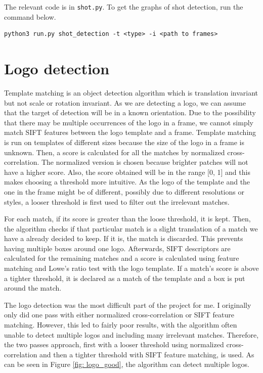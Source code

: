 \documentclass{article}
\begin{document}
The relevant code is in \texttt{shot.py}. To get the graphs of shot detection, run the command below. 
\begin{verbatim}
python3 run.py shot_detection -t <type> -i <path to frames>
\end{verbatim}

\section{Logo detection}
Template matching is an object detection algorithm which is translation invariant but not scale or rotation invariant. As we are detecting a logo, we can assume that the target of detection will be in a known orientation. Due to the possibility that there may be multiple occurrences of the logo in a frame, we cannot simply match SIFT features between the logo template and a frame. Template matching is run on templates of different sizes because the size of the logo in a frame is unknown. Then, a score is calculated for all the matches by normalized cross-correlation. The normalized version is chosen because brighter patches will not have a higher score. Also, the score obtained will be in the range [0, 1] and this makes choosing a threshold more intuitive. As the logo of the template and the one in the frame might be of different, possibly due to different resolutions or styles, a looser threshold is first used to filter out the irrelevant matches. 

For each match, if its score is greater than the loose threshold, it is kept. Then, the algorithm checks if that particular match is a slight translation of a match we have a already decided to keep. If it is, the match is discarded. This prevents having multiple boxes around one logo. Afterwards, SIFT descriptors are calculated for the remaining matches and a score is calculated using feature matching and Lowe's ratio test with the logo template. If a match's score is above a tighter threshold, it is declared as a match of the template and a box is put around the match.

The logo detection was the most difficult part of the project for me. I originally only did one pass with either normalized cross-correlation or SIFT feature matching. However, this led to fairly poor results, with the algorithm often unable to detect multiple logos and including many irrelevant matches. Therefore, the two passes approach, first with a looser threshold using normalized cross-correlation and then a tighter threshold with SIFT feature matching, is used. As can be seen in Figure \ref{fig: logo_good}, the algorithm can detect multiple logos.
\end{document}
